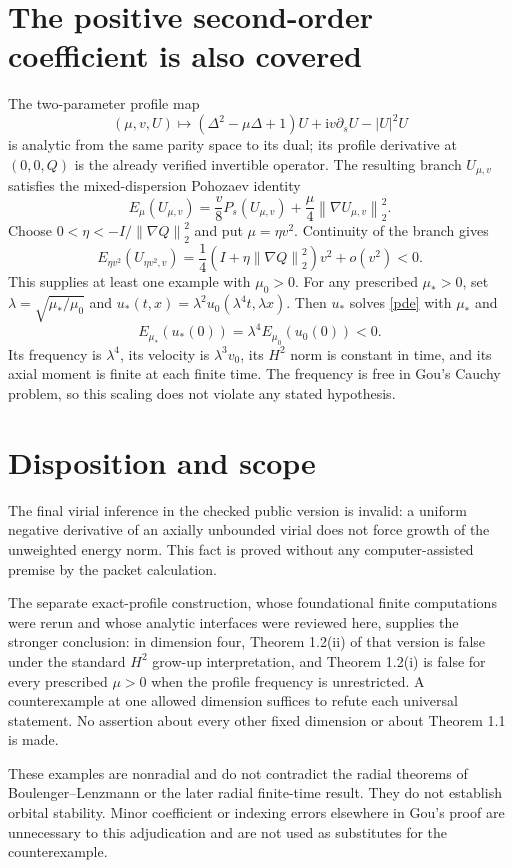 \documentclass[11pt,a4paper]{article}
\newcommand{\ii}{\mathrm i}
\newcommand{\norm}[1]{\left\|#1\right\|}
\begin{document}
\section{The positive second-order coefficient is also covered}
The two-parameter profile map
\[
 (\mu,v,U)\longmapsto(\Delta^2-\mu\Delta+1)U+
 \ii v\partial_sU-|U|^2U
\]
is analytic from the same parity space to its dual; its profile derivative at $(0,0,Q)$ is the already verified invertible operator. The resulting branch $U_{\mu,v}$ satisfies the mixed-dispersion Pohozaev identity
\begin{equation}\label{mixed}
 E_\mu(U_{\mu,v})=\frac v8P_s(U_{\mu,v})+
 \frac\mu4\norm{\nabla U_{\mu,v}}_2^2.
\end{equation}
Choose $0<\eta<-I/\norm{\nabla Q}_2^2$ and put $\mu=\eta v^2$. Continuity of the branch gives
\[
 E_{\eta v^2}(U_{\eta v^2,v})=
 \frac14\left(I+\eta\norm{\nabla Q}_2^2\right)v^2+o(v^2)<0.
\]
This supplies at least one example with $\mu_0>0$. For any prescribed $\mu_*>0$, set $\lambda=\sqrt{\mu_*/\mu_0}$ and $u_*(t,x)=\lambda^2u_0(\lambda^4t,\lambda x)$. Then $u_*$ solves \eqref{pde} with $\mu_*$ and
\[
 E_{\mu_*}(u_*(0))=\lambda^4E_{\mu_0}(u_0(0))<0.
\]
Its frequency is $\lambda^4$, its velocity is $\lambda^3v_0$, its $H^2$ norm is constant in time, and its axial moment is finite at each finite time. The frequency is free in Gou's Cauchy problem, so this scaling does not violate any stated hypothesis.

\section{Disposition and scope}
The final virial inference in the checked public version is invalid: a uniform negative derivative of an axially unbounded virial does not force growth of the unweighted energy norm. This fact is proved without any computer-assisted premise by the packet calculation.

The separate exact-profile construction, whose foundational finite computations were rerun and whose analytic interfaces were reviewed here, supplies the stronger conclusion: in dimension four, Theorem 1.2(ii) of that version is false under the standard $H^2$ grow-up interpretation, and Theorem 1.2(i) is false for every prescribed $\mu>0$ when the profile frequency is unrestricted. A counterexample at one allowed dimension suffices to refute each universal statement. No assertion about every other fixed dimension or about Theorem 1.1 is made.

These examples are nonradial and do not contradict the radial theorems of Boulenger--Lenzmann or the later radial finite-time result. They do not establish orbital stability. Minor coefficient or indexing errors elsewhere in Gou's proof are unnecessary to this adjudication and are not used as substitutes for the counterexample.
\end{document}
